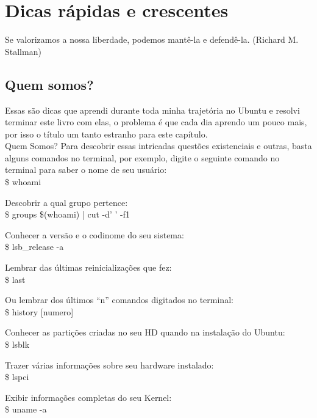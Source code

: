 \chapter{Dicas rápidas e crescentes}

\begin{remark}
Se valorizamos a nossa liberdade, podemos mantê-la e defendê-la. (Richard M. Stallman)
\end{remark}

\section{Quem somos?}
Essas são dicas que aprendi durante toda minha trajetória no Ubuntu e resolvi terminar este livro com elas, o problema é que cada dia aprendo um pouco mais, por isso o título um tanto estranho para este capítulo. \\[3mm]
Quem Somos? Para descobrir essas intricadas questões existenciais e outras, basta alguns comandos no terminal, por exemplo, digite o seguinte comando no terminal para saber o nome de seu usuário: \\
{\ttfamily\$ whoami}

Descobrir a qual grupo pertence: \\
{\ttfamily\$ groups \$(whoami) | cut -d' ' -f1}

Conhecer a versão e o codinome do seu sistema: \\
{\ttfamily\$ lsb\_release -a}

Lembrar das últimas reinicializações que fez: \\
{\ttfamily\$ last}

Ou lembrar dos últimos ``n'' comandos digitados no terminal: \\
{\ttfamily\$ history [numero]}

Conhecer as partições criadas no seu HD quando na instalação do Ubuntu: \\
{\ttfamily\$ lsblk}

Trazer várias informações sobre seu hardware instalado: \\
{\ttfamily\$ lspci}

Exibir informações completas do seu Kernel: \\
{\ttfamily\$ uname -a}

